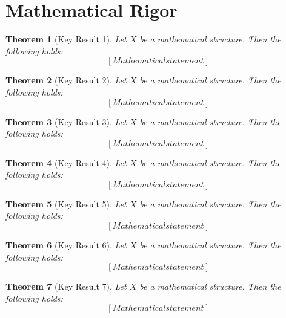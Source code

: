 \documentclass[12pt]{article}
\newtheorem{theorem}{Theorem}
\begin{document}
\section{Mathematical Rigor}

\begin{theorem}[Key Result 1]
Let $X$ be a mathematical structure. Then the following holds:
\begin{equation}
\label{eq:theorem_1}
[Mathematical statement]
\end{equation}
\end{theorem}

\begin{theorem}[Key Result 2]
Let $X$ be a mathematical structure. Then the following holds:
\begin{equation}
\label{eq:theorem_2}
[Mathematical statement]
\end{equation}
\end{theorem}

\begin{theorem}[Key Result 3]
Let $X$ be a mathematical structure. Then the following holds:
\begin{equation}
\label{eq:theorem_3}
[Mathematical statement]
\end{equation}
\end{theorem}

\begin{theorem}[Key Result 4]
Let $X$ be a mathematical structure. Then the following holds:
\begin{equation}
\label{eq:theorem_4}
[Mathematical statement]
\end{equation}
\end{theorem}

\begin{theorem}[Key Result 5]
Let $X$ be a mathematical structure. Then the following holds:
\begin{equation}
\label{eq:theorem_5}
[Mathematical statement]
\end{equation}
\end{theorem}

\begin{theorem}[Key Result 6]
Let $X$ be a mathematical structure. Then the following holds:
\begin{equation}
\label{eq:theorem_6}
[Mathematical statement]
\end{equation}
\end{theorem}

\begin{theorem}[Key Result 7]
Let $X$ be a mathematical structure. Then the following holds:
\begin{equation}
\label{eq:theorem_7}
[Mathematical statement]
\end{equation}
\end{theorem}
\end{document}
